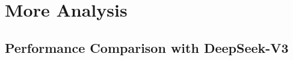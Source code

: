 





\section{More Analysis}\label{sec:exp_ana}

\subsection{ Performance  Comparison with DeepSeek-V3}




